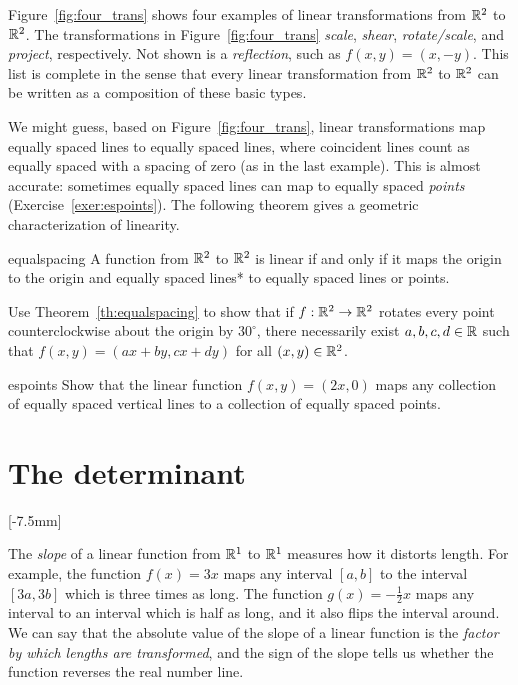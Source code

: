 \documentclass{watsonbook}
\begin{document}
Figure~\ref{fig:four_trans} shows four examples of linear
transformations from $\mathbb{R}^2$ to $\mathbb{R}^2$. The transformations in
Figure~\ref{fig:four_trans} \textit{scale}, \textit{shear},
\textit{rotate/scale}, and \textit{project}, respectively. Not shown
is a \textit{reflection}, such as $f(x,y) = (x,-y)$. This list is
complete in the sense that every linear transformation from $\mathbb{R}^2$ to
$\mathbb{R}^2$ can be written as a composition of these basic types.

We might guess, based on Figure~\ref{fig:four_trans}, linear
transformations map equally spaced lines to equally spaced lines,
where coincident lines count as equally spaced with a spacing of zero
(as in the last example). This is almost accurate: sometimes equally
spaced lines can map to equally spaced \textit{points}
(Exercise~\ref{exer:espoints}). The following theorem gives a
geometric characterization of linearity. 

\begin{theo}{}{equalspacing}
  A function from $\mathbb{R}^2$ to $\mathbb{R}^2$ is linear if and only if it maps
  the origin to the origin and equally spaced lines* to equally spaced
  lines or points. 
\end{theo}

\begin{exercise}{}{}
  Use Theorem~\ref{th:equalspacing} to show that if
  $f : \mathbb{R}^2 \to \mathbb{R}^2$ rotates every point counterclockwise about the
  origin by $30^\circ$, there necessarily exist $a,b,c,d\in\mathbb{R}$ such
  that $f(x,y) = (ax+ by, cx+ dy)$ for all $(x,y) \in\mathbb{R}^2$.
\end{exercise}

\begin{exercise}{}{espoints}
  Show that the linear function $f(x,y)=(2x,0)$ maps any collection of
  equally spaced vertical lines to a collection of equally spaced points.
\end{exercise}

\section{The determinant} \label{sec:det} 

[-7.5mm]

The \textit{slope} of a linear function from $\mathbb{R}^1$ to $\mathbb{R}^1$ measures
how it distorts length. For example, the function $f(x) = 3x$ maps any
interval $[a,b]$ to the interval $[3a,3b]$ which is three times as
long. The function $g(x) = -\tfrac{1}{2}x$ maps any interval to an
interval which is half as long, and it also flips the interval
around. We can say that the absolute value of the slope of a linear
function is the \textit{factor by which lengths are transformed}, and
the sign of the slope tells us whether the function reverses the real
number line.
\end{document}
